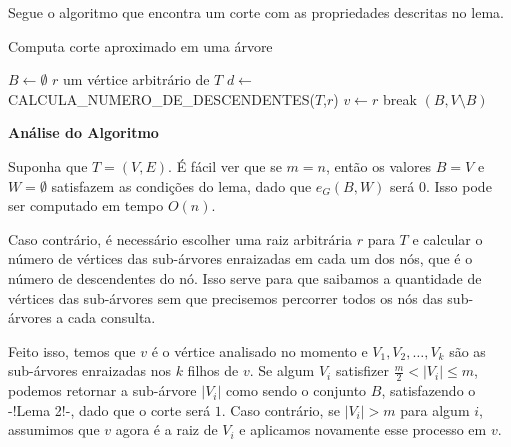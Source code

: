 \documentclass[a4paper,12pt]{article}
\begin{document}
Segue o algoritmo que encontra um corte com as propriedades descritas
no lema.

\medskip

\begin{algorithm}[H]

	\caption{Computa corte aproximado em uma árvore}
	$B \gets \emptyset$\;
	{
		$r$ um vértice arbitrário de $T$\;
		$d \gets $ CALCULA\_NUMERO\_DE\_DESCENDENTES($T$,$r$)\;
		$v \gets r$\;
		{
		{
			{
				break\;
			}
		}
		}
	}
	\Return $(B,V\setminus B)$

\end{algorithm}	

\bigskip
\bigskip

\textbf{Análise do Algoritmo}

	Suponha que $T=(V,E)$.
	É fácil ver que se $m=n$, então os valores $B = V$ e $W = \emptyset$ 
	satisfazem as condições do lema, dado que $e_G(B,W)$ será $0$. 
	Isso pode ser computado em tempo $O(n)$.

	Caso contrário, é necessário escolher uma raiz arbitrária $r$ para $T$
	e calcular o número de vértices das sub-árvores enraizadas 
	em cada um dos nós, que é o número de descendentes do nó.
	Isso serve para que saibamos a quantidade de vértices das sub-árvores
	sem que precisemos percorrer todos os nós das sub-árvores a cada consulta.

	Feito isso, temos que $v$ é o vértice analisado no momento e 
	$V_1, V_2, \ldots, V_k$ são as sub-árvores enraizadas nos $k$ filhos
	de $v$.
	Se algum $V_i$ satisfizer $\frac{m}{2}<|V_i|\le m$, podemos retornar
	a sub-árvore $|V_i|$ como sendo o conjunto $B$, satisfazendo o -!Lema 2!-,
	dado que o corte será $1$.
	Caso contrário, se $|V_i|> m$ para algum $i$, assumimos que 
	$v$ agora é a raiz de $V_i$ e aplicamos novamente esse processo em $v$.
\end{document}
